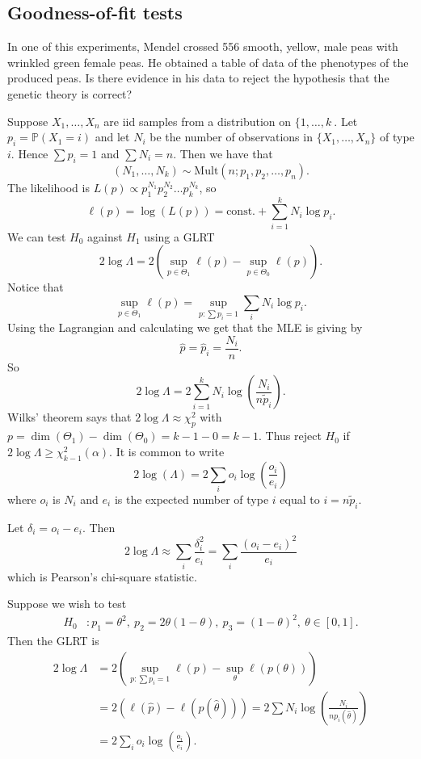 \documentclass{article}
\begin{document}
\subsection{Goodness-of-fit tests}
\begin{example}
  In one of this experiments, Mendel crossed 556 smooth, yellow, male peas with wrinkled green female peas. He obtained a table of data of the phenotypes of the produced peas. Is there evidence in his data to reject the hypothesis that the genetic theory is correct?\par
  Suppose $ X_1,\dots, X_n $ are iid samples from a distribution on $ \{ 1,\dots, k\ $. Let $ p_i = \mathbb P(X_1 = i) $ and let $ N_i $ be the number of observations in $ \{X_1,\dots, X_n\} $ of type $ i $. Hence $ \sum p_i = 1 $ and $ \sum N_i = n $. Then we have that
	  \[
		  (N_1, \dots, N_k) \sim \mathrm{Mult}(n; p_1,p_2,\dots, p_n).
	  \]
	  The likelihood is $ L(p)\propto p_1^{N_1}p_2^{N_2}\dots p_k^{N_k} $, so
	  \[
		  \ell(p) = \log(L(p)) = \text{const.} + \sum_{i=1}^k N_i\log p_i.
	  \]
	  We can test $ H_0 $ against $ H_1 $ using a GLRT
	  \[
		  2\log\Lambda = 2\left(\sup_{p\in\Theta_1} \ell(p) - \sup_{p\in \Theta_0} \ell(p)\right).
	  \]
	  Notice  that
	  \[
		  \sup_{p\in \Theta_1} \ell(p) = \sup_{p:\sum p_i = 1} \sum_i N_i \log p_i.
	  \]
	  Using the Lagrangian and calculating we get that the MLE is giving by
	  \[
		  \hat p = \hat p_i = \frac{N_i}n.
	  \]
	  So 
	  \[
		  2\log\Lambda = 2\sum_{i=1}^k N_i \log\left(\frac {N_i}{n\tilde p_i}\right).
	  \]
	  Wilks' theorem says that 
	  $ 2\log \Lambda\approx \chi_p^2 $ with $ p=\dim(\Theta_1)-\dim(\Theta_0) = k-1 - 0 = k-1 $. Thus reject $ H_0 $ if $ 2\log \Lambda\ge \chi_{k-1}^2(\alpha) $. It is common to write
	  \[
		  2\log(\Lambda) = 2\sum_i o_i \log\left(\frac{o_i}{e_i}\right)
	  \]
	  where $ o_i $ is $ N_i $ and $ e_i $ is the expected number of type $ i $ equal to $ i = n\tilde p_i $.\par
	  Let $ \delta_i = o_i - e_i $. Then 
	  \[
		  2\log\Lambda \approx \sum_i \frac{\delta_i^2}{e_i} = \sum_i \frac{(o_i-e_i)^2}{e_i}
	  \]
	  which is Pearson's chi-square statistic.
	\end{example}
	Suppose we wish to test
	\begin{align*}
		H_0 &: p_1 =\theta^2,\  p_2=2\theta(1-\theta),\ p_3= (1-\theta)^2,\ \theta\in[0,1].
	\end{align*}
	Then the GLRT is
	\begin{align*}
		2\log \Lambda&= 2\left(\sup_{p:\sum p_i = 1} \ell(p) - \sup_\theta \ell(p(\theta))\right) \\
			     &= 2(\ell(\hat p) - \ell(p(\hat \theta))) = 2\sum N_i \log\left(\frac {N_i}{n p_i(\hat\theta)}\right)\\
			     &= 2\sum_i o_i\log\left(\frac{o_i}{e_i}\right).
	\end{align*}
\end{document}
